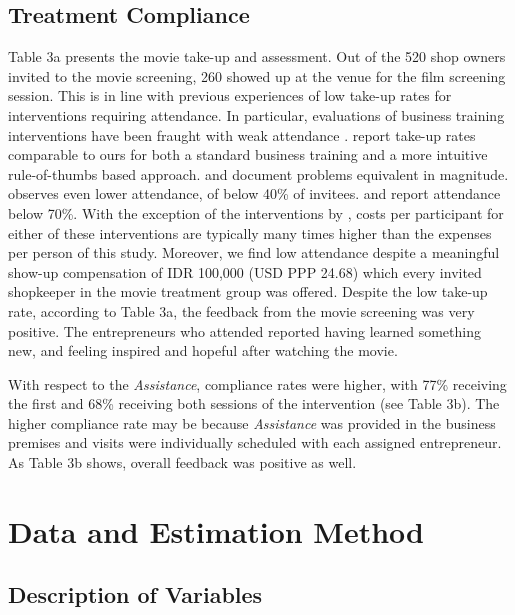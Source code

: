 \documentclass[11.5pt]{article}
\begin{document}
\subsection{Treatment Compliance}

Table 3a presents the movie take-up and assessment. Out of the 520 shop owners invited to the movie screening, 260 showed up at the venue for the film screening session. This is in line with previous experiences of low take-up rates for interventions requiring attendance. In particular, evaluations of business training interventions have been fraught with weak attendance \citep[for a review, see][]{McKenzie2014}. \citet{Drexler2014} report take-up rates comparable to ours for both a standard business training and a more intuitive rule-of-thumbs based approach. \citet{Gine2014} and \citet{Bruhn2017} document problems equivalent in magnitude. \citet{Bruhn2013} observes even lower attendance, of below 40\% of invitees. \citet{Calderon2013} and \citet{Premand2016} report attendance below 70\%. With the exception of the interventions by \citet{Drexler2014}, costs per participant for either of these interventions are typically many times higher than the expenses per person of this study. Moreover, we find low attendance despite a meaningful show-up compensation of IDR 100,000 (USD PPP 24.68) which every invited shopkeeper in the movie treatment group was offered. %
Despite the low take-up rate, according to Table 3a, the feedback from the movie screening was very positive. The entrepreneurs who attended reported having learned something new, and feeling inspired and hopeful after watching the movie.

With respect to the \emph{Assistance}, compliance rates were higher, with 77\% receiving the first and 68\% receiving both sessions of the intervention (see Table 3b). The higher compliance rate may be because \emph{Assistance} was provided in the business premises and visits were individually scheduled with each assigned entrepreneur. As Table 3b shows, overall feedback was positive as well.

\section{Data and Estimation Method}\label{sec.data}

\subsection{Description of Variables}
\end{document}
